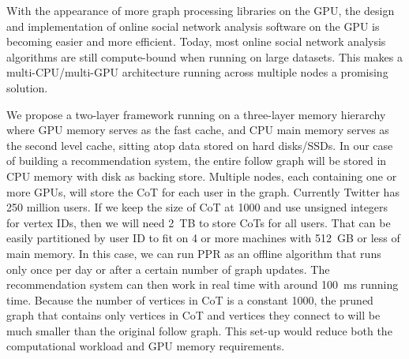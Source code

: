 \documentclass{article}
\begin{document}
With the appearance of more graph processing libraries on the GPU, the
design and implementation of online social network analysis software on the
GPU is becoming easier and more efficient. Today, most online social
network analysis algorithms are still compute-bound when running on large
datasets. This makes a multi-CPU/multi-GPU architecture running across
multiple nodes a promising solution.

We propose a two-layer framework running on a three-layer memory hierarchy
where GPU memory serves as the fast cache, and CPU main memory serves as
the second level cache, sitting atop data stored on hard disks/SSDs. In our
case of building a recommendation system, the entire follow graph will be
stored in CPU memory with disk as backing store. Multiple nodes, each
containing one or more GPUs, will store the CoT for each user in the graph.
Currently Twitter has 250 million users.  If we keep the size of CoT at
1000 and use unsigned integers for vertex IDs, then we will need 2~TB to
store CoTs for all users. That can be easily partitioned by user ID to fit
on 4 or more machines with 512~GB or less of main memory. In this case, we
can run PPR as an offline algorithm that runs only once per day or after a
certain number of graph updates. The recommendation system can then work in
real time with around 100~ms running time. Because the number of vertices
in CoT is a constant 1000, the pruned graph that contains only vertices in
CoT and vertices they connect to will be much smaller than the original
follow graph. This set-up would reduce both the computational workload and
GPU memory requirements.
\end{document}
